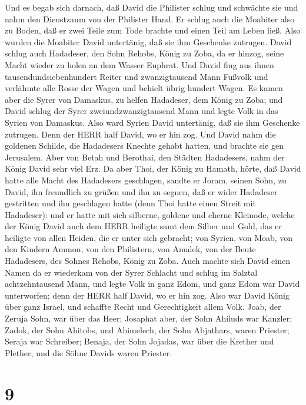  Und es begab sich darnach, daß David die Philister schlug
und schwächte sie und nahm den Dienstzaum von der Philister Hand.
 Er schlug auch die Moabiter also zu Boden, daß er zwei
Teile zum Tode brachte und einen Teil am Leben ließ. Also wurden die
Moabiter David untertänig, daß sie ihm Geschenke zutrugen. 
David schlug auch Hadadeser, den Sohn Rehobs, König zu Zoba, da er
hinzog, seine Macht wieder zu holen an dem Wasser Euphrat. 
Und David fing aus ihnen tausendundsiebenhundert Reiter und
zwanzigtausend Mann Fußvolk und verlähmte alle Rosse der Wagen und
behielt übrig hundert Wagen.  Es kamen aber die Syrer von
Damaskus, zu helfen Hadadeser, dem König zu Zoba; und David schlug der
Syrer zweiundzwanzigtausend Mann  und legte Volk in das
Syrien von Damaskus. Also ward Syrien David untertänig, daß sie ihm
Geschenke zutrugen. Denn der HERR half David, wo er hin zog.
 Und David nahm die goldenen Schilde, die Hadadesers Knechte
gehabt hatten, und brachte sie gen Jerusalem.  Aber von
Betah und Berothai, den Städten Hadadesers, nahm der König David sehr
viel Erz.  Da aber Thoi, der König zu Hamath, hörte, daß
David hatte alle Macht des Hadadesers geschlagen,  sandte
er Joram, seinen Sohn, zu David, ihn freundlich zu grüßen und ihn zu
segnen, daß er wider Hadadeser gestritten und ihn geschlagen hatte (denn
Thoi hatte einen Streit mit Hadadeser): und er hatte mit sich silberne,
goldene und eherne Kleinode,  welche der König David auch
dem HERR heiligte samt dem Silber und Gold, das er heiligte von allen
Heiden, die er unter sich gebracht;  von Syrien, von Moab,
von den Kindern Ammon, von den Philistern, von Amalek, von der Beute
Hadadesers, des Sohnes Rehobs, König zu Zoba.  Auch machte
sich David einen Namen da er wiederkam von der Syrer Schlacht und schlug
im Salztal achtzehntausend Mann,  und legte Volk in ganz
Edom, und ganz Edom war David unterworfen; denn der HERR half David, wo
er hin zog.  Also war David König über ganz Israel, und
schaffte Recht und Gerechtigkeit allem Volk.  Joab, der
Zeruja Sohn, war über das Heer; Josaphat aber, der Sohn Ahiluds war
Kanzler;  Zadok, der Sohn Ahitobs, und Ahimelech, der Sohn
Abjathars, waren Priester; Seraja war Schreiber;  Benaja,
der Sohn Jojadas, war über die Krether und Plether, und die Söhne Davids
waren Priester.

\hypertarget{section-8}{%
\section{9}\label{section-8}}

